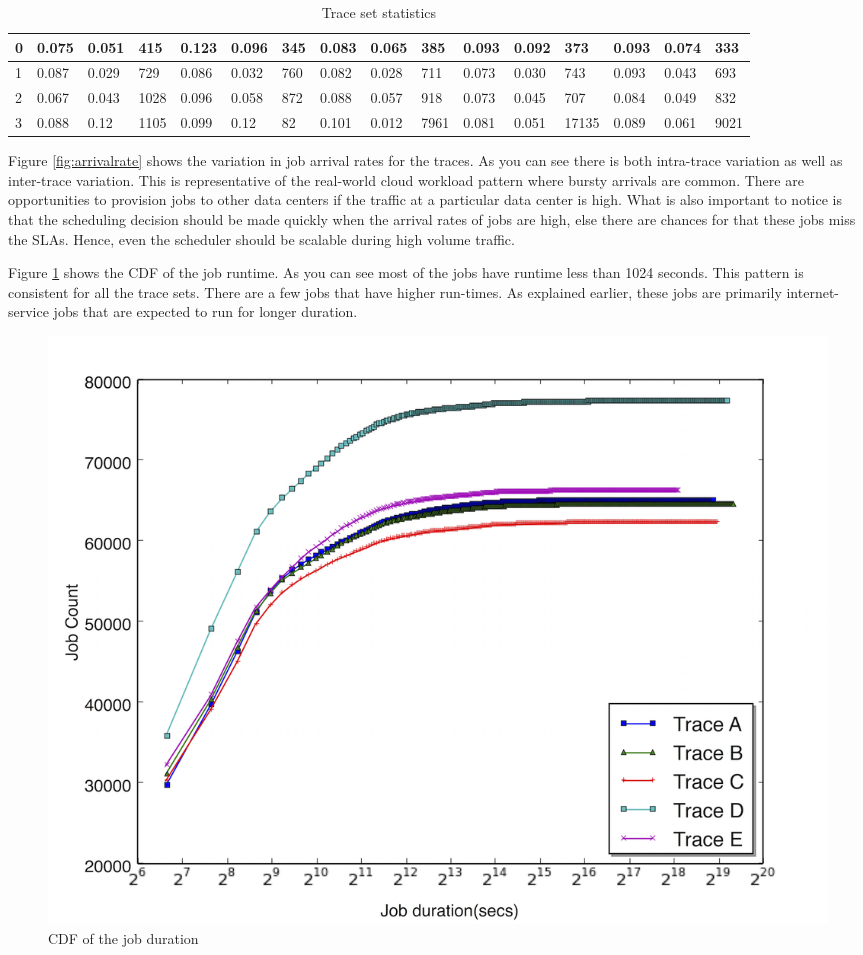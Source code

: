 \documentclass[letterpaper,twocolumn,10pt]{article}
\begin{document}
\begin{table}
{\begin{tabular}{|l|l|l|l|l|l|l|l|l|l|l|l|l|l|l|l|}
0 & 0.075 & 0.051 & 415 & 0.123 & 0.096 & 345 & 0.083 & 0.065 & 385 & 0.093 & 0.092 & 373 & 0.093 & 0.074 & 333 \\ \hline
1 & 0.087 & 0.029 & 729 & 0.086 & 0.032 & 760 & 0.082 & 0.028 & 711 & 0.073 & 0.030 & 743 & 0.093 & 0.043 & 693 \\ \hline
2 & 0.067 & 0.043 & 1028 & 0.096 & 0.058 & 872 & 0.088 & 0.057 & 918 & 0.073 & 0.045 & 707 & 0.084 & 0.049 & 832 \\ \hline
3 & 0.088 & 0.12 & 1105 & 0.099 & 0.12 & 82 & 0.101 & 0.012 & 7961 & 0.081 & 0.051 & 17135 & 0.089 & 0.061 & 9021 \\ \hline
\end{tabular}
}
\caption {Trace set statistics} \label{tab:tracestat} 
\end{table}

Figure \ref{fig:arrivalrate} shows the variation in job arrival rates for the traces. As you can see there is both intra-trace variation as well as inter-trace variation. This is representative of the real-world cloud workload pattern where bursty arrivals are common. There are opportunities to provision jobs to other data centers if the traffic at a particular data center is high. What is also important to notice is that the scheduling decision should be made quickly when the arrival rates of jobs are high, else there are chances for that these jobs miss the SLAs. Hence, even the scheduler should be scalable during high volume traffic. 

Figure \ref{fig:runtime} shows the CDF of the job runtime. As you can see most of the jobs have runtime less than 1024 seconds. This pattern is consistent for all the trace sets. There are a few jobs that have higher run-times. As explained earlier, these jobs are primarily internet-service jobs that are expected to run for longer duration. 


\begin{figure}[] 
\centering
\includegraphics[scale=0.25]{runtime}
\caption{CDF of the job duration}
\label{fig:runtime}
\end{figure}
\end{document}
